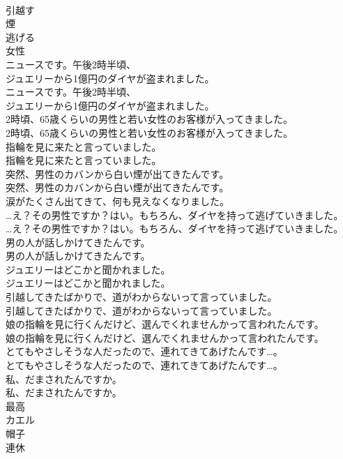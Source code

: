 \documentclass[8pt]{extreport}
\begin{document}
\begin{CJK}{UTF8}{min}
\\	引越す
\\	煙
\\	逃げる
\\	女性
\\	ニュースです。午後2時半頃、
\\	ジュエリーから1億円のダイヤが盗まれました。	
\\	ニュースです。午後2時半頃、
\\	ジュエリーから1億円のダイヤが盗まれました。 
\\	2時頃、65歳くらいの男性と若い女性のお客様が入ってきました。	
\\	2時頃、65歳くらいの男性と若い女性のお客様が入ってきました。 
\\	指輪を見に来たと言っていました。	
\\	指輪を見に来たと言っていました。 
\\	突然、男性のカバンから白い煙が出てきたんです。	
\\	突然、男性のカバンから白い煙が出てきたんです。 
\\	涙がたくさん出てきて、何も見えなくなりました。 
\\	…え？その男性ですか？はい。もちろん、ダイヤを持って逃げていきました。	
\\	…え？その男性ですか？はい。もちろん、ダイヤを持って逃げていきました。 
\\	男の人が話しかけてきたんです。	
\\	男の人が話しかけてきたんです。 
\\	ジュエリーはどこかと聞かれました。	
\\	ジュエリーはどこかと聞かれました。 
\\	引越してきたばかりで、道がわからないって言っていました。	
\\	引越してきたばかりで、道がわからないって言っていました。 
\\	娘の指輪を見に行くんだけど、選んでくれませんかって言われたんです。	
\\	娘の指輪を見に行くんだけど、選んでくれませんかって言われたんです。 
\\	とてもやさしそうな人だったので、連れてきてあげたんです…。	
\\	とてもやさしそうな人だったので、連れてきてあげたんです…。 
\\	私、だまされたんですか。	
\\	私、だまされたんですか。 
\\	最高
\\	カエル
\\	帽子
\\	連休

\end{CJK}
\end{document}
